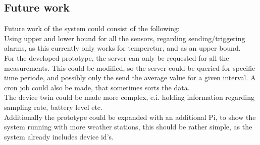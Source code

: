 \subsection*{Future work}
Future work of the system could consist of the following:\\
Using upper and lower bound for all the sensors, regarding sending/triggering alarms, as this currently only works for temperetur, and as an upper bound.\\
For the developed prototype, the server can only be requested for all the measurements. This could be modified, so the server could be queried for specific time periode, and possibly only the send the average value for a given interval. A cron job could also be made, that sometimes sorts the data.\\
The device twin could be made more complex, e.i. holding information regarding sampling rate, battery level etc.\\
Additionally the prototype could be expanded with an additional Pi, to show the system running with more weather stations, this should be rather simple, as the system already includes device id's.\\ 